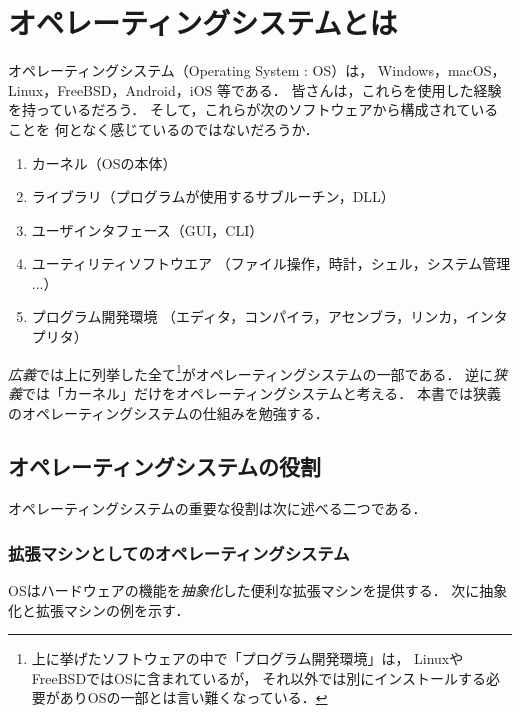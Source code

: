 \chapter{オペレーティングシステムとは}

オペレーティングシステム（Operating System : OS）は，
Windows，macOS，Linux，FreeBSD，Android，iOS
等である．
皆さんは，これらを使用した経験を持っているだろう．
そして，これらが次のソフトウェアから構成されていることを
何となく感じているのではないだろうか．

\begin{enumerate}
\item カーネル（OSの本体）
\item ライブラリ（プログラムが使用するサブルーチン，DLL）
\item ユーザインタフェース（GUI，CLI）
\item ユーティリティソフトウエア
  （ファイル操作，時計，シェル，システム管理 ...）
\item プログラム開発環境
  （エディタ，コンパイラ，アセンブラ，リンカ，インタプリタ）
\end{enumerate}

\emph{広義}では上に列挙した全て\footnote{
  上に挙げたソフトウェアの中で「プログラム開発環境」は，
  LinuxやFreeBSDではOSに含まれているが，
  それ以外では別にインストールする必要がありOSの一部とは言い難くなっている．
}がオペレーティングシステムの一部である．
逆に\emph{狭義}では「カーネル」だけをオペレーティングシステムと考える．
本書では狭義のオペレーティングシステムの仕組みを勉強する．

\section{オペレーティングシステムの役割}
\label{osRole}

オペレーティングシステムの重要な役割は次に述べる二つである．

\subsection{拡張マシンとしてのオペレーティングシステム}
\label{abstraction}

OSはハードウェアの機能を\emph{抽象化}した便利な拡張マシンを提供する．
次に抽象化と拡張マシンの例を示す．

